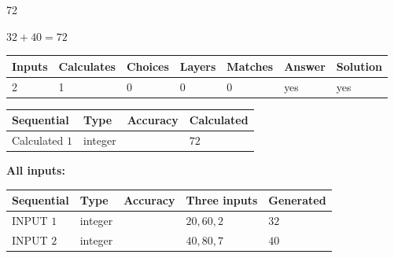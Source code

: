 \documentclass{ctexart}
\begin{document}
 

72
 
 
\noindent{}
 
 

 
 
 
\noindent{}
 
 

$ %
32 +  %
40=   %
72$
 
 
\noindent{}
 
 

 
   
   
   
   
\noindent\begin{tabular}{|l|l|l|l|l|l|l|}
 \hline
Inputs & Calculates & Choices & Layers & Matches & Answer & Solution \\ \hline
 2  & 
 1  & 
 0
  & 
 0  & 
 0  & 
  yes & 
  yes 
  \\ \hline
 \end{tabular}
   
   
   
   
\noindent{}
   
   
  
  
\noindent\begin{tabular}{|l|l|l|l|}
\hline
 Sequential & Type & Accuracy & Calculated \\ 
\hline
 
 
  Calculated $  1 $ & integer &  & 
  $ 72 $ 
 \\  \hline  
 \end{tabular}
   
   
   
   
\noindent\vspace{0.1in}\hspace{-0.08in} {\textbf{\Large{All inputs: }}}
   
   
  
  
\noindent\begin{tabular}{|l|l|l|l|l|}
\hline
 Sequential & Type & Accuracy & Three inputs & Generated \\ 
\hline
 
 
  INPUT $  1 $ & integer &  & $
 20
 , 
 60
 , 
 2
 $ & $ 32 $ 
 \\  \hline  
 
 
  INPUT $  2 $ & integer &  & $
 40
 , 
 80
 , 
 7
 $ & $ 40 $ 
 \\  \hline  
 \end{tabular}
   
\end{document}
